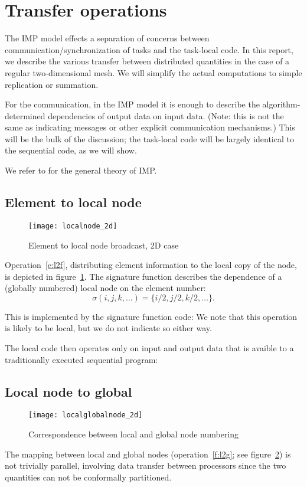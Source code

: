 \documentclass[11pt,fleqn,preprint]{impreport}
\begin{document}
\section{Transfer operations}

The \ac{IMP} model effects a separation of concerns between
communication/synchronization of tasks and the task-local code.
%
In this report,
we describe the various transfer between distributed quantities in the
case of a regular two-dimensional mesh. We will simplify the actual
computations to simple replication or summation.

For the communication, in the \ac{IMP} model it is enough to describe
the algorithm-determined dependencies of output data on input
data. (Note: this is not the same as indicating messages or other
explicit communication mechanisms.) This will be the bulk of the
discussion; the task-local code will be largely identical to the
sequential code, as we will show.

We refer to \cite{IMP-01} for the general theory of \ac{IMP}.

\pagebreak
\subsection{Element to local node}
%
\begin{figure}[h]
  \texttt{[image: localnode\_2d]}
  \caption{Element to local node broadcast, 2D case}
  \label{fig:lulesh2d_localnode}
\end{figure}
%
Operation~\ref{e:l2f}, distributing element information to the local
copy of the node, is depicted in figure~\ref{fig:lulesh2d_localnode}.
The signature function describes the dependence of a (globally
numbered) local node on the element number:
\[ \sigma(i,j,k,\ldots) = \{ i/2,j/2,k/2,\ldots \}. \]

This is implemented by the signature function code:
%
%
We note that this operation is likely to be local, but we do not
indicate so either way.

\pagebreak
The local code then operates only on input and output data that is
avaible to a traditionally executed sequential program:
%

\pagebreak
\subsection{Local node to global}
%
\begin{figure}[h]
  \texttt{[image: localglobalnode\_2d]}
  \caption{Correspondence between local and global node numbering}
  \label{fig:localglobal2d}
\end{figure}
%
The mapping between local and global nodes (operation~\ref{f:l2g}; see
figure~\ref{fig:localglobal2d})
is not trivially parallel, involving data transfer between processors
since the two quantities can not be conformally partitioned.
\end{document}
